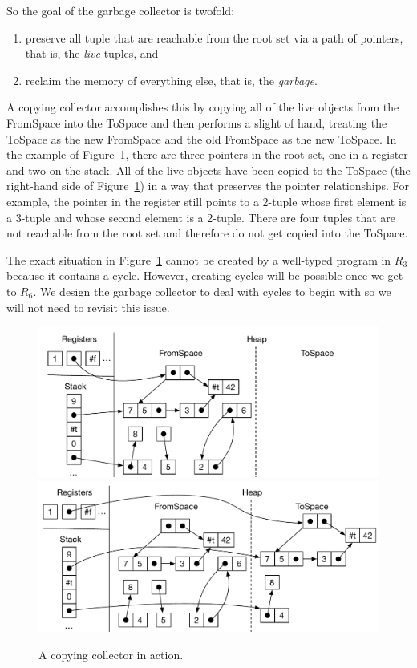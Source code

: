 \documentclass[11pt]{book}
\begin{document}
So the goal of the garbage collector is twofold:
\begin{enumerate}
\item preserve all tuple that are reachable from the root set via a
  path of pointers, that is, the \emph{live} tuples, and
\item reclaim the memory of everything else, that is, the
  \emph{garbage}.
\end{enumerate}
A copying collector accomplishes this by copying all of the live
objects from the FromSpace into the ToSpace and then performs a slight
of hand, treating the ToSpace as the new FromSpace and the old
FromSpace as the new ToSpace.  In the example of
Figure~\ref{fig:copying-collector}, there are three pointers in the
root set, one in a register and two on the stack.  All of the live
objects have been copied to the ToSpace (the right-hand side of
Figure~\ref{fig:copying-collector}) in a way that preserves the
pointer relationships. For example, the pointer in the register still
points to a 2-tuple whose first element is a 3-tuple and whose second
element is a 2-tuple.  There are four tuples that are not reachable
from the root set and therefore do not get copied into the ToSpace.

The exact situation in Figure~\ref{fig:copying-collector} cannot be
created by a well-typed program in $R_3$ because it contains a
cycle. However, creating cycles will be possible once we get to $R_6$.
We design the garbage collector to deal with cycles to begin with so
we will not need to revisit this issue.

\begin{figure}[tbp]
\centering
\includegraphics[width=\textwidth]{figs/copy-collect-1} \\[5ex]
\includegraphics[width=\textwidth]{figs/copy-collect-2}
\caption{A copying collector in action.}
\label{fig:copying-collector}
\end{figure}
\end{document}

